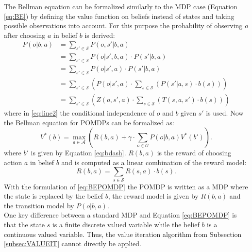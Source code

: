 The Bellman equation can be formalized similarly to the MDP case (Equation \ref{eq:BE}) by defining the value function on beliefs instead of states and taking possible observations into account. For this purpose the probability of observing $o$ after choosing $a$ in belief $b$ is derived:
%
\begin{align}
    P(o|b,a) &= \sum_{s'\in\mathcal{S}}P(o,s'|b,a)\\
    &= \sum_{s'\in\mathcal{S}}P(o|s',b, a)\cdot P(s'|b, a)\\
    &=\label{eq:line2} \sum_{s'\in\mathcal{S}}P(o|s', a)\cdot P(s'|b, a)\\
    &=\label{eq:line3}  \sum_{s'\in\mathcal{S}}\left(P(o|s', a)\cdot \sum_{s\in\mathcal{S}}\left(P(s'|a,s)\cdot b(s)\right)\right)\\
    &= \sum_{s'\in\mathcal{S}}\left(Z(o,s', a)\cdot \sum_{s\in\mathcal{S}}\left(T(s,a,s')\cdot b(s)\right)\right)
\end{align}
%
where in \ref{eq:line2} the conditional independence of $o$ and $b$ given $s'$ is used. Now the Bellman equation for POMDPs can be formalized as:
%
\begin{equation}\label{eq:BEPOMDP}
    V^*(b) = \underset{a\in\mathcal{A}}{\max}\left( R(b,a) + \gamma\cdot \sum_{o\in\mathcal{O}} P(o|b,a)V^*(b') \right).
\end{equation}
%
where $b'$ is given by Equation \ref{eq:bdash}. $R(b,a)$ is the reward of choosing action $a$ in belief $b$ and is computed as a linear combination of the reward model:
%
\begin{equation}\label{eq:R_b}
    R(b,a) = \sum_{s\in\mathcal{S}}R(s,a)\cdot b(s).
\end{equation}
%
With the formulation of \ref{eq:BEPOMDP} the POMDP is written as a MDP where the state is replaced by the belief $b$, the reward model is given by $R(b,a)$ and the transition model by $P(o|b,a)$.\\

One key difference between a standard MDP and Equation \ref{eq:BEPOMDP} is that the state $s$ is a finite discrete valued variable while the belief $b$ is a continuous valued variable. Thus, the value iteration algorithm from Subsection \ref{subsec:VALUEIT} cannot directly be applied.\\

